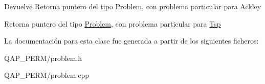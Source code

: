 \begin{DoxyReturn}{Devuelve}
Retorna puntero del tipo \hyperlink{class_problem}{Problem}, con problema particular para Ackley

Retorna puntero del tipo \hyperlink{class_problem}{Problem}, con problema particular para \hyperlink{class_tsp}{Tsp} 
\end{DoxyReturn}


La documentación para esta clase fue generada a partir de los siguientes ficheros\+:\begin{DoxyCompactItemize}
\item 
Q\+A\+P\+\_\+\+P\+E\+R\+M/problem.\+h\item 
Q\+A\+P\+\_\+\+P\+E\+R\+M/problem.\+cpp\end{DoxyCompactItemize}

